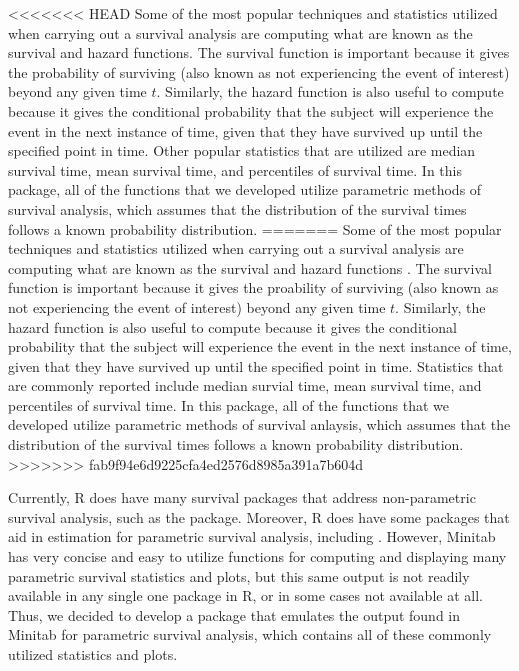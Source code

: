 \textless{}\textless{}\textless{}\textless{}\textless{}\textless{}\textless{}
HEAD Some of the most popular techniques and statistics utilized when
carrying out a survival analysis are computing what are known as the
survival and hazard functions. The survival function is important
because it gives the probability of surviving (also known as not
experiencing the event of interest) beyond any given time \(t\).
Similarly, the hazard function is also useful to compute because it
gives the conditional probability that the subject will experience the
event in the next instance of time, given that they have survived up
until the specified point in time. Other popular statistics that are
utilized are median survival time, mean survival time, and percentiles
of survival time. In this package, all of the functions that we
developed utilize parametric methods of survival analysis, which assumes
that the distribution of the survival times follows a known probability
distribution. ======= Some of the most popular techniques and statistics
utilized when carrying out a survival analysis are computing what are
known as the survival and hazard functions \citep{Kleinbaum2012}. The
survival function is important because it gives the proability of
surviving (also known as not experiencing the event of interest) beyond
any given time \(t\). Similarly, the hazard function is also useful to
compute because it gives the conditional probability that the subject
will experience the event in the next instance of time, given that they
have survived up until the specified point in time. Statistics that are
commonly reported include median survial time, mean survival time, and
percentiles of survival time. In this package, all of the functions that
we developed utilize parametric methods of survival anlaysis, which
assumes that the distribution of the survival times follows a known
probability distribution.
\textgreater{}\textgreater{}\textgreater{}\textgreater{}\textgreater{}\textgreater{}\textgreater{}
fab9f94e6d9225cfa4ed2576d8985a391a7b604d

Currently, R does have many survival packages that address
non-parametric survival analysis, such as the  package.
Moreover, R does have some packages that aid in estimation for
parametric survival analysis, including . However,
Minitab has very concise and easy to utilize functions for computing and
displaying many parametric survival statistics and plots, but this same
output is not readily available in any single one package in R, or in
some cases not available at all. Thus, we decided to develop a package
that emulates the output found in Minitab for parametric survival
analysis, which contains all of these commonly utilized statistics and
plots.

